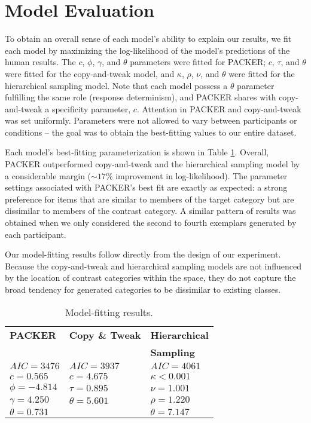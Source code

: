 \documentclass[10pt,letterpaper]{article}
\begin{document}
\section{Model Evaluation}
To obtain an overall sense of each model's ability to explain our results, we fit each model by maximizing the log-likelihood of the model's predictions of the human results. The $c$, $\phi$, $\gamma$, and $\theta$ parameters were fitted for PACKER; $c$, $\tau$, and $\theta$ were fitted for the copy-and-tweak model, and $\kappa$, $\rho$, $\nu$, and $\theta$ were fitted for the hierarchical sampling model. Note that each model possess a $\theta$ parameter fulfilling the same role (response determinism), and PACKER shares with copy-and-tweak a specificity parameter, $c$. Attention in PACKER and copy-and-tweak was set uniformly. Parameters were not allowed to vary between participants or conditions -- the goal was to obtain the best-fitting values to our entire dataset.

Each model's best-fitting parameterization is shown in Table \ref{table:model-fits}. Overall, PACKER outperformed copy-and-tweak and the hierarchical sampling model by a considerable margin ($\sim17\%$ improvement in log-likelihood). The parameter settings associated with PACKER's best fit are exactly as expected: a strong preference for items that are similar to members of the target category but are dissimilar to members of the contrast category. A similar pattern of results was obtained when we only considered the second to fourth exemplars generated by each participant.

Our model-fitting results follow directly from the design of our experiment. Because the copy-and-tweak and hierarchical sampling models are not influenced by the location of contrast categories within the space, they do not capture the broad tendency for generated categories to be dissimilar to existing classes. 

\begin{table}
\centering
\caption{Model-fitting results.}
\label{table:model-fits}
\begin{tabular}{ l l l}
\\
 \textbf{PACKER} & \textbf{Copy \& Tweak} & \textbf{Hierarchical} \\
 & & \textbf{Sampling} \\ \hline
 $AIC = 3476$ & $AIC = 3937$ & $AIC = 4061$  \\ 
 $c=0.565$ & $c=4.675$  & $\kappa<0.001$\\
$\phi=-4.814$ & $\tau=0.895$ & $\nu=1.001$ \\ 
$\gamma=4.250$ & $\theta=5.601$ &  $\rho=1.220$  \\ 
 $\theta=0.731$ &  & $\theta = 7.147$  \\ 
\end{tabular}
\end{table}
\end{document}
